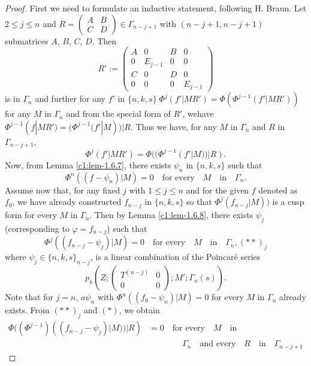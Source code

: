 \begin{proof}
First we need to formulate an inductive statement, following H.\@
Braun. Let $2\leq j\leq n$ and $R=\left(\begin{smallmatrix} A & B\\ C
  & D\end{smallmatrix}\right)\in\Gamma_{n-j+1}$ with $(n-j+1, n-j+1)$
  submatrices $A$, $B$, $C$, $D$. Then
$$
R':=
\begin{pmatrix}
A & 0 & B & 0\\
0 &  E_{j-1} & 0 & 0\\
C & 0 & D & 0\\
0 & 0 & 0 & E_{j-1}
\end{pmatrix}
$$
is in $\Gamma_{n}$ and further for any $f'$ in
$\{n,k,s\} \; \Phi^{j}(f'|MR')=\Phi(\Phi^{j-1}(f'|MR'))$ for any $M$ in
$\Gamma_{n}$ and from the special form of $R'$, we\pageoriginale have
$\Phi^{j-1}(f|MR')=(\Phi^{j-1}(f'|M))|R$. Thus we have, for any $M$ in
$\Gamma_{n}$ and $R$ in $\Gamma_{n-j+1}$,
\begin{equation*}
\Phi^{j}(f'|MR')=\Phi((\Phi^{j-1}(f'|M))|R).\tag{$\ast$}
\end{equation*}
Now, from Lemma \ref{c1:lem-1.6.7}, there exists $\psi_{n}$ in
$\{n,k,s\}$ such that
$$
\Phi^{n}((f-\psi_{n})|M)=0\quad\text{for every}\quad
M\quad\text{in}\quad \Gamma_{n}.
$$
Assume now that, for any fixed $j$ with $1\leq j\leq n$ and for the
given $f$ denoted as $f_{0}$, we have already constructed $f_{n-j}$ in
$\{n,k,s\}$ so that $\Phi^{j}(f_{n-j}|M))$ is a cusp form for every
$M$ in $\Gamma_{n}$. Then by Lemma \ref{c1:lem-1.6.8}, there exists
$\psi_{j}$ (corresponding to $\varphi=f_{n-j}$) such that
$$
\Phi^{j}((f_{n-j}-\psi_{j})|M)=0\quad\text{for every}\quad
M\quad\text{in}\quad \Gamma_{n},(\ast\ast)_{j}
$$
where $\psi_{j}\in \{n,k,s\}_{n-j}$, is a linear combination of the
Poincar\'e series 
$$
p_{k}(Z;
\begin{pmatrix}
T^{(n-j)} & 0\\
0 & 0
\end{pmatrix};
M'; \Gamma_{n}(s)).
$$
Note that for $j=n$, $a\psi_{n}$ with $\Phi^{n}((f_{0}-\psi_{n})|M)=0$
for every $M$ in $\Gamma_{n}$ already exists. From $(\ast\ast)_{j}$
and $(\ast)$, we obtain
\begin{align*}
\Phi((\Phi^{j-1})((f_{n-j}-\psi_{j})|M))|R)&=0\quad\text{for
  every}\quad M\quad\text{in}\\ 
&\qquad\qquad\Gamma_{n}\quad\text{and
  every}\quad R\quad\text{in}\quad \Gamma_{n-j+1}
\end{align*}

\end{proof}
